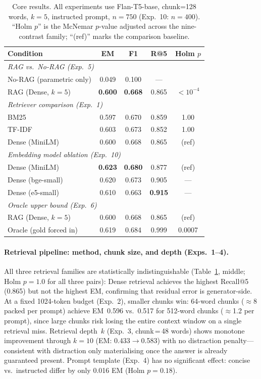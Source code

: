 \documentclass{article}
\begin{document}
\begin{table}[t]
\centering
\caption{Core results. All experiments use Flan-T5-base, chunk=128
  words, $k\!=\!5$, instructed prompt, $n\!=\!750$ (Exp.~10:
  $n\!=\!400$). ``Holm $p$'' is the McNemar $p$-value adjusted across
  the nine-contrast family; ``(ref)'' marks the comparison baseline.}
\label{tab:core}
\small
\begin{tabular}{lcccc}
\toprule
Condition & EM & F1 & R@5 & Holm $p$ \\
\midrule
\multicolumn{5}{l}{\textit{RAG vs.\ No-RAG (Exp.\ 5)}} \\
No-RAG (parametric only) & 0.049 & 0.100 & --- & \\
RAG (Dense, $k\!=\!5$) & \textbf{0.600} & \textbf{0.668} & 0.865 &
  $<\!10^{-4}$ \\
\midrule
\multicolumn{5}{l}{\textit{Retriever comparison (Exp.\ 1)}} \\
BM25   & 0.597 & 0.670 & 0.859 & 1.00 \\
TF-IDF & 0.603 & 0.673 & 0.852 & 1.00 \\
Dense (MiniLM) & 0.600 & 0.668 & 0.865 & (ref) \\
\midrule
\multicolumn{5}{l}{\textit{Embedding model ablation (Exp.\ 10)}} \\
Dense (MiniLM)  & \textbf{0.623} & \textbf{0.680} & 0.877 & (ref) \\
Dense (bge-small) & 0.620 & 0.673 & 0.905 & --- \\
Dense (e5-small)  & 0.610 & 0.663 & \textbf{0.915} & --- \\
\midrule
\multicolumn{5}{l}{\textit{Oracle upper bound (Exp.\ 6)}} \\
RAG (Dense, $k\!=\!5$)       & 0.600 & 0.668 & 0.865 & (ref) \\
Oracle (gold forced in) & 0.619 & 0.684 & 0.999 & 0.0007 \\
\bottomrule
\end{tabular}
\end{table}

\paragraph{Retrieval pipeline: method, chunk size, and depth (Exps.\ 1--4).}
All three retrieval families are statistically indistinguishable
(Table~\ref{tab:core}, middle; Holm $p\!=\!1.0$ for all three pairs):
Dense retrieval achieves the highest Recall@5 (0.865) but not the
highest EM, confirming that residual error is generator-side.
At a fixed 1024-token budget (Exp.~2), smaller chunks win: 64-word
chunks ($\approx$8 packed per prompt) achieve EM~0.596 vs.\ 0.517 for
512-word chunks ($\approx$1.2 per prompt), since large chunks risk
losing the entire context window on a single retrieval miss.
Retrieval depth~$k$ (Exp.~3, chunk\,=\,48 words) shows monotone
improvement through $k\!=\!10$ (EM: 0.433$\to$0.583) with no distraction
penalty---consistent with distraction only materialising once the answer
is already guaranteed present.
Prompt template (Exp.~4) has no significant effect: concise vs.\
instructed differ by only 0.016 EM (Holm $p\!=\!0.18$).
\end{document}
